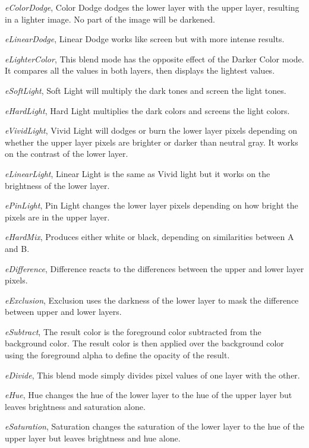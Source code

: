 \begin{DoxyItemize}
\item {\itshape e\+Color\+Dodge}, Color Dodge dodges the lower layer with the upper layer, resulting in a lighter image. No part of the image will be darkened.
\item {\itshape e\+Linear\+Dodge}, Linear Dodge works like screen but with more intense results.
\item {\itshape e\+Lighter\+Color}, This blend mode has the opposite effect of the Darker Color mode. It compares all the values in both layers, then displays the lightest values.
\item {\itshape e\+Soft\+Light}, Soft Light will multiply the dark tones and screen the light tones.
\item {\itshape e\+Hard\+Light}, Hard Light multiplies the dark colors and screens the light colors.
\item {\itshape e\+Vivid\+Light}, Vivid Light will dodges or burn the lower layer pixels depending on whether the upper layer pixels are brighter or darker than neutral gray. It works on the contrast of the lower layer.
\item {\itshape e\+Linear\+Light}, Linear Light is the same as Vivid light but it works on the brightness of the lower layer.
\item {\itshape e\+Pin\+Light}, Pin Light changes the lower layer pixels depending on how bright the pixels are in the upper layer.
\item {\itshape e\+Hard\+Mix}, Produces either white or black, depending on similarities between A and B.
\item {\itshape e\+Difference}, Difference reacts to the differences between the upper and lower layer pixels.
\item {\itshape e\+Exclusion}, Exclusion uses the darkness of the lower layer to mask the difference between upper and lower layers.
\item {\itshape e\+Subtract}, The result color is the foreground color subtracted from the background color. The result color is then applied over the background color using the foreground alpha to define the opacity of the result.
\item {\itshape e\+Divide}, This blend mode simply divides pixel values of one layer with the other.
\item {\itshape e\+Hue}, Hue changes the hue of the lower layer to the hue of the upper layer but leaves brightness and saturation alone.
\item {\itshape e\+Saturation}, Saturation changes the saturation of the lower layer to the hue of the upper layer but leaves brightness and hue alone.

\end{DoxyItemize}
